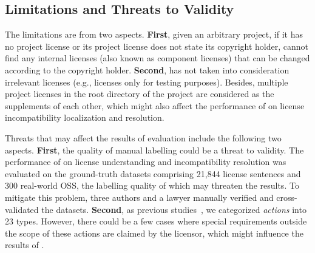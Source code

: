 \subsection{Limitations and Threats to Validity}
The limitations are from two aspects. %
%
\textbf{First}, given an arbitrary project, if it has no project license or its project license does not state its copyright holder, \tool cannot find any internal licenses (also known as component licenses) that can be changed according to the copyright holder. %
%
\textbf{Second}, \tool has not taken into consideration irrelevant licenses (e.g., licenses only for testing purposes). Besides, multiple project licenses in the root directory of the project {are considered as the supplements of each other}, which might also affect the performance of \tool on license incompatibility localization and resolution. 

Threats that may affect the results of evaluation include the following two aspects. \textbf{First}, the quality of manual labelling could be a threat to validity. The performance of \tool on license understanding and incompatibility resolution was evaluated on the ground-truth datasets comprising {21,844} license sentences and {300} real-world OSS, the labelling quality of which may
threaten the results. To mitigate this problem, three authors and a lawyer manually verified and cross-validated the datasets. %
%
\textbf{Second}, as previous studies~\cite{tldrlegal,xu2021lidetector}, we categorized \textit{actions} into 23 types. However, there could be a few cases where special requirements outside the scope of these actions are claimed by the licensor, which might influence the results of \tool.
%
